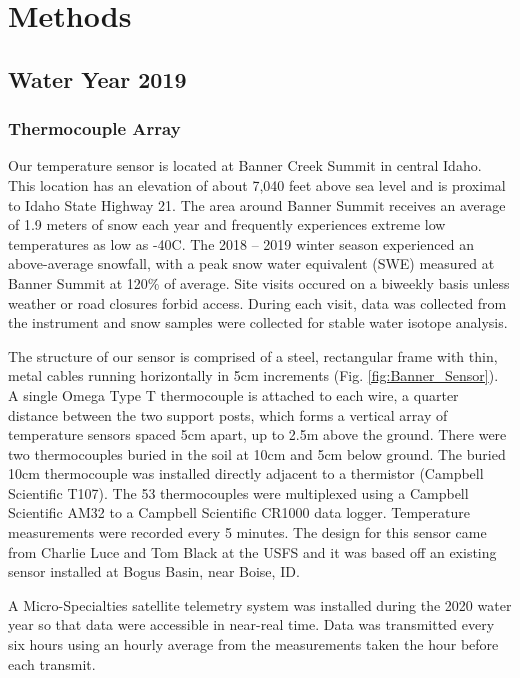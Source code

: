 \chapter{Methods}
\section{Water Year 2019} 
\subsection{Thermocouple Array}
Our temperature sensor is located at Banner Creek Summit in central Idaho. This location has an elevation of about 7,040 feet above sea level and is proximal to Idaho State Highway 21. The area around Banner Summit receives an average of 1.9 meters of snow each year and frequently experiences extreme low temperatures as low as -40\textdegree C. The 2018 -- 2019 winter season experienced an above-average snowfall, with a peak snow water equivalent (SWE) measured at Banner Summit at 120\% of average. Site visits occured on a biweekly basis unless weather or road closures forbid access. During each visit, data was collected from the instrument and snow samples were collected for stable water isotope analysis.

The structure of our sensor is comprised of a steel, rectangular frame with thin, metal cables running horizontally in 5cm increments (Fig. \ref{fig:Banner_Sensor}). A single Omega Type T thermocouple is attached to each wire, a quarter distance between the two support posts, which forms a vertical array of temperature sensors spaced 5cm apart, up to 2.5m above the ground. There were two thermocouples buried in the soil at 10cm and 5cm below ground. The buried 10cm thermocouple was installed directly adjacent to a thermistor (Campbell Scientific T107). The 53 thermocouples were multiplexed using a Campbell Scientific AM32 to a Campbell Scientific CR1000 data logger. Temperature measurements were recorded every 5 minutes. The design for this sensor came from Charlie Luce and Tom Black at the USFS and it was based off an existing sensor installed at Bogus Basin, near Boise, ID. 

A Micro-Specialties satellite telemetry system was installed during the 2020 water year so that data were accessible in near-real time. Data was transmitted every six hours using an hourly average from the measurements taken the hour before each transmit.


